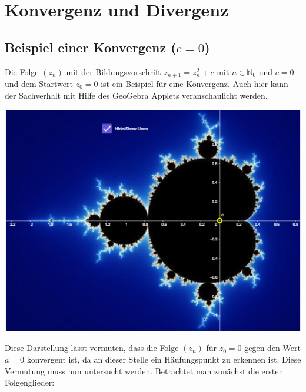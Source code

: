 \documentclass[a4paper, 12pt]{book}
\begin{document}
\sloppy

\chapter{Konvergenz und Divergenz}

\section{Beispiel einer Konvergenz ($c=0$)}

Die Folge \(\left( z_{n} \right)\) mit der Bildungsvorschrift
\(z_{n + 1} = z_{n}^{2} + c\) mit \(n \in \mathbb{N}_{0}\) und
\(c=0\) und dem Startwert \(z_{0} = 0\) ist ein Beispiel für
eine Konvergenz. Auch hier kann der Sachverhalt mit Hilfe des GeoGebra
Applets veranschaulicht werden.

\includegraphics[width=\linewidth]{image9.png}


Diese Darstellung lässt vermuten, dass die Folge
\(\left( z_{n} \right)\) für \(z_{0} = 0\) gegen den Wert
\(a = 0\) konvergent ist, da an dieser Stelle ein Häufungspunkt zu
erkennen ist. Diese Vermutung muss nun untersucht werden. Betrachtet man
zunächst die ersten Folgenglieder:
\end{document}
